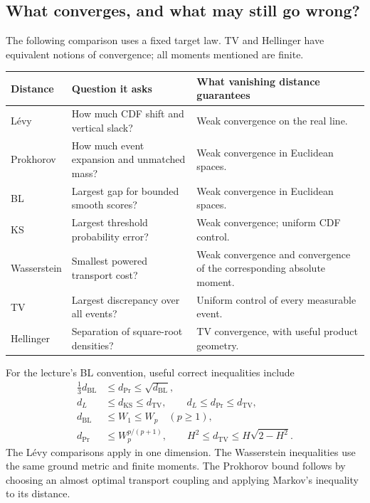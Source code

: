 \documentclass[12pt]{article}
\begin{document}
\clearpage
\begingroup\small
\subsection{What converges, and what may still go wrong?}
The following comparison uses a fixed target law. TV and Hellinger have
equivalent notions of convergence; all moments mentioned are finite.

\begin{center}
\small
\begin{tabular}{@{}>{\raggedright\arraybackslash}p{.18\linewidth}>{\raggedright\arraybackslash}p{.35\linewidth}>{\raggedright\arraybackslash}p{.39\linewidth}@{}}
\toprule
Distance & Question it asks & What vanishing distance guarantees \\
\midrule
L\'evy & How much CDF shift and vertical slack? & Weak convergence on the real line.\\[4pt]
Prokhorov & How much event expansion and unmatched mass? & Weak convergence in Euclidean spaces.\\[4pt]
BL & Largest gap for bounded smooth scores? & Weak convergence in Euclidean spaces.\\[4pt]
KS & Largest threshold probability error? & Weak convergence; uniform CDF control.\\[4pt]
Wasserstein & Smallest powered transport cost? & Weak convergence and convergence of the corresponding absolute moment.\\[4pt]
TV & Largest discrepancy over all events? & Uniform control of every measurable event.\\[4pt]
Hellinger & Separation of square-root densities? & TV convergence, with useful product geometry.\\
\bottomrule
\end{tabular}
\end{center}
For the lecture's BL convention, useful correct inequalities include
\begin{align}
 \tfrac13d_{\mathrm{BL}}&\le d_{\mathrm{Pr}}\le\sqrt{d_{\mathrm{BL}}},\\
 d_L&\le d_{\mathrm{KS}}\le d_{\mathrm{TV}},\qquad
 d_L\le d_{\mathrm{Pr}}\le d_{\mathrm{TV}},\\
 d_{\mathrm{BL}}&\le W_1\le W_p\quad(p\ge1),\\
 d_{\mathrm{Pr}}&\le W_p^{p/(p+1)},\qquad
 H^2\le d_{\mathrm{TV}}\le H\sqrt{2-H^2}.
\end{align}
The L\'evy comparisons apply in one dimension. The Wasserstein inequalities
use the same ground metric and finite moments. The Prokhorov bound follows
by choosing an almost optimal transport coupling and applying Markov's
inequality to its distance.
\end{document}
